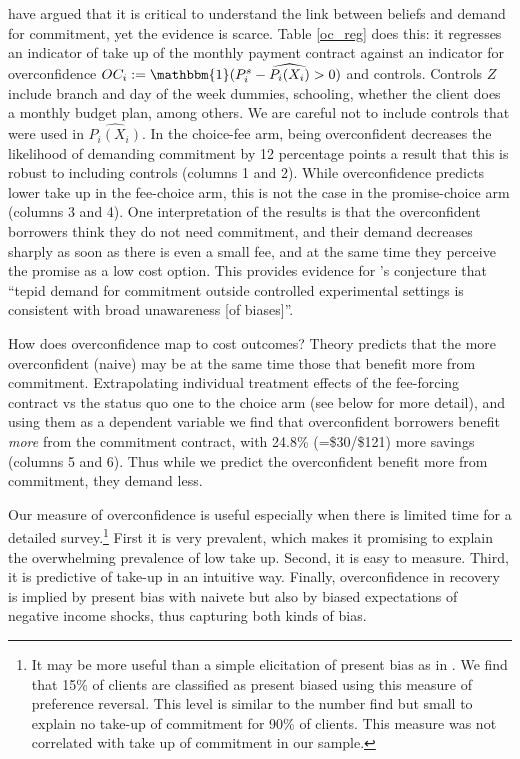 \documentclass[oneside,11pt]{article}
\begin{document}
\cite{Sprenger} have argued that it is critical to understand the link between beliefs and demand for commitment, yet the evidence is scarce. Table \ref{oc_reg} does this: it regresses an indicator of take up of the monthly payment contract against an indicator for overconfidence $OC_i:=\mathbbm{1}(P^s_i-\widehat{P_i(X_i)}>0)$ and controls. Controls $Z$ include branch and day of the week dummies, schooling, whether the client does a monthly budget plan, among others. We are careful not to include controls that were used in $\widehat{P_i(X_i)}$. %
In the choice-fee arm, being overconfident decreases the likelihood of demanding commitment by 12 percentage points a result that this is robust to including controls  (columns 1 and 2). While overconfidence predicts lower take up in the fee-choice arm, this is not the case in the promise-choice arm (columns 3 and 4).  One interpretation of the results is that the overconfident borrowers think they do not need commitment, and their demand decreases sharply as soon as there is even a small fee, and at the same time they perceive the promise as a low cost option. This provides evidence for \cite{Sprenger}'s conjecture that ``tepid demand for commitment outside controlled experimental settings is consistent with broad unawareness [of biases]''. 

How does overconfidence map to cost outcomes? Theory predicts that the more overconfident (naive) may be at the same time those that benefit more from commitment. Extrapolating individual treatment effects of the fee-forcing contract vs the status quo one to the choice arm (see below for more detail), and using them as a dependent variable we find that overconfident borrowers benefit \textit{more} from the commitment contract, with 24.8\% (=\$30/\$121) more savings (columns 5 and 6). Thus while we predict the overconfident benefit more from commitment, they demand less. 

\vspace{.2in}
Our measure of overconfidence is useful especially when there is limited time for a detailed survey.\footnote{It may be more useful than a simple elicitation of present bias as in \cite{Ashraf}. We find that 15\% of clients are classified as present biased using this measure of preference reversal. This level is similar to the number \cite{Ashraf} find but small to explain no take-up of commitment for 90\% of clients. This measure was not correlated with take up of commitment in our sample.} First it is very prevalent, which makes it promising to explain the overwhelming prevalence of low take up. Second, it is easy to measure. Third, it is predictive of take-up in an intuitive way. Finally, overconfidence in recovery is implied by present bias with naivete but also by biased expectations of negative income shocks, thus capturing both kinds of bias. 
\end{document}
